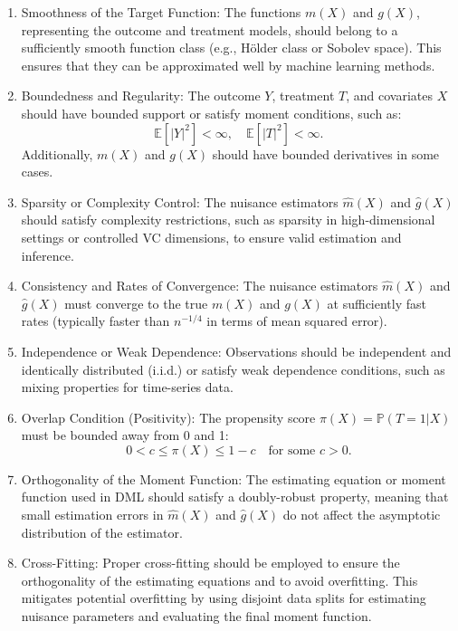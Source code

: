 \documentclass{article}
\numberwithin{equation}{section}
\begin{document}
\begin{enumerate}[label=\roman*.]
    \item Smoothness of the Target Function: The functions \( m(X) \) and \( g(X) \), representing the outcome and treatment models, should belong to a sufficiently smooth function class (e.g., Hölder class or Sobolev space). This ensures that they can be approximated well by machine learning methods.
    \item Boundedness and Regularity: The outcome \( Y \), treatment \( T \), and covariates \( X \) should have bounded support or satisfy moment conditions, such as:  
    \[
    \mathbb{E}[|Y|^2] < \infty, \quad \mathbb{E}[|T|^2] < \infty.
    \]  
    Additionally, \( m(X) \) and \( g(X) \) should have bounded derivatives in some cases.
    \item Sparsity or Complexity Control: The nuisance estimators \( \hat{m}(X) \) and \( \hat{g}(X) \) should satisfy complexity restrictions, such as sparsity in high-dimensional settings or controlled VC dimensions, to ensure valid estimation and inference.
    \item Consistency and Rates of Convergence: The nuisance estimators \( \hat{m}(X) \) and \( \hat{g}(X) \) must converge to the true \( m(X) \) and \( g(X) \) at sufficiently fast rates (typically faster than \( n^{-1/4} \) in terms of mean squared error). 
    \item Independence or Weak Dependence: Observations should be independent and identically distributed (i.i.d.) or satisfy weak dependence conditions, such as mixing properties for time-series data.
    \item Overlap Condition (Positivity): The propensity score \( \pi(X) = \mathbb{P}(T=1|X) \) must be bounded away from 0 and 1:  
    \[
    0 < c \leq \pi(X) \leq 1 - c \quad \text{for some } c > 0.
    \]
    \item Orthogonality of the Moment Function: The estimating equation or moment function used in DML should satisfy a doubly-robust property, meaning that small estimation errors in \( \hat{m}(X) \) and \( \hat{g}(X) \) do not affect the asymptotic distribution of the estimator.
    \item Cross-Fitting: Proper cross-fitting should be employed to ensure the orthogonality of the estimating equations and to avoid overfitting. This mitigates potential overfitting by using disjoint data splits for estimating nuisance parameters and evaluating the final moment function.
\end{enumerate}
\end{document}
